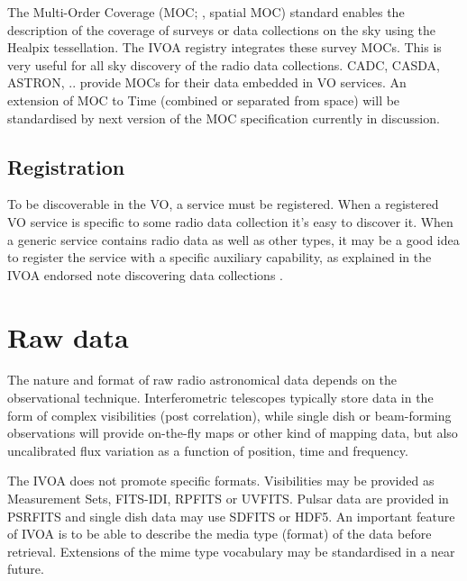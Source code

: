 \documentclass[11pt,a4paper]{ivoa}
\begin{document}
The Multi-Order Coverage (MOC; \cite{2019ivoa.spec.1007F}, spatial MOC) standard enables the description of the coverage of surveys or data collections on the sky using the Healpix tessellation. The IVOA registry integrates these survey MOCs. This is very useful for all sky discovery of the radio data collections. CADC, CASDA, ASTRON, .. provide MOCs for their data embedded in VO services. An extension of MOC to Time (combined or separated from space) will be standardised by next version of the MOC specification currently in discussion.

\subsection{Registration} 
To be discoverable in the VO, a service must be registered.
When a registered VO service is specific to some radio data collection it's easy to discover it. When a generic service contains radio data as well as other types, it may be a good idea to register the service with a specific auxiliary capability, as explained in the IVOA endorsed note discovering data collections \citep{2019ivoa.rept.0520D}.

\section{Raw data}
The nature and format of raw radio astronomical data 
depends on the observational technique. Interferometric telescopes typically store data in the form of complex visibilities (post correlation), while single dish or beam-forming observations will provide on-the-fly maps or other kind of mapping data, but also uncalibrated flux variation as a function of position, time and frequency. 

The IVOA does not promote specific formats. Visibilities may be provided as Measurement Sets, FITS-IDI, RPFITS or UVFITS. Pulsar data are provided in PSRFITS and single dish data may use SDFITS or HDF5. An important feature of IVOA is to be able to describe the media type (format) of the data before retrieval. Extensions of the mime type vocabulary may be standardised in a near future.  
\end{document}
